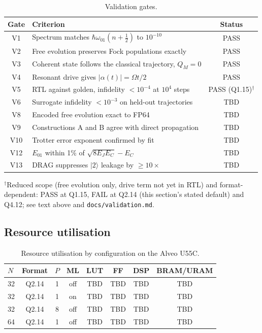 \documentclass[smallextended]{svjour3}
\begin{document}
\begin{table}[t]
\caption{Validation gates.}
\label{tab:validation}
\begin{tabular}{clc}
\toprule
Gate & Criterion & Status \\
\midrule
V1  & Spectrum matches $\hbar\omega_{01}(n+\tfrac12)$ to $10^{-10}$ & PASS \\
V2  & Free evolution preserves Fock populations exactly & PASS \\
V3  & Coherent state follows the classical trajectory, $Q_M = 0$ & PASS \\
V4  & Resonant drive gives $|\alpha(t)| = \Omega t/2$ & PASS \\
V5  & RTL against golden, infidelity $< 10^{-4}$ at $10^4$ steps & PASS (Q1.15)$^\dagger$ \\
V6  & Surrogate infidelity $< 10^{-3}$ on held-out trajectories & TBD \\
V8  & Encoded free evolution exact to FP64 & TBD \\
V9  & Constructions A and B agree with direct propagation & TBD \\
V10 & Trotter error exponent confirmed by fit & TBD \\
V12 & $E_{01}$ within 1\% of $\sqrt{8E_JE_C} - E_C$ & TBD \\
V13 & DRAG suppresses $|2\rangle$ leakage by $\ge 10\times$ & TBD \\
\bottomrule
\end{tabular}
\end{table}

$^\dagger$Reduced scope (free evolution only, drive term not yet in RTL) and format-
dependent: PASS at Q1.15, FAIL at Q2.14 (this section's stated default) and Q4.12; see
text above and \texttt{docs/validation.md}.

\subsection{Resource utilisation}

\begin{table}[t]
\caption{Resource utilisation by configuration on the Alveo U55C.}
\label{tab:resources}
\begin{tabular}{lccccccc}
\toprule
$N$ & Format & $P$ & ML & LUT & FF & DSP & BRAM/URAM \\
\midrule
32 & Q2.14 & 1  & off & TBD & TBD & TBD & TBD \\
32 & Q2.14 & 1  & on  & TBD & TBD & TBD & TBD \\
32 & Q2.14 & 8  & off & TBD & TBD & TBD & TBD \\
64 & Q2.14 & 1  & off & TBD & TBD & TBD & TBD \\
\bottomrule
\end{tabular}
\end{table}
\end{document}
